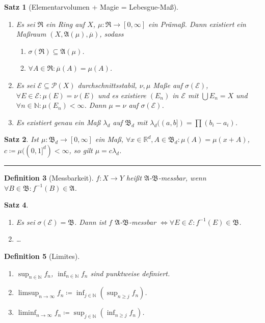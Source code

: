 \documentclass[a4paper]{article}
\newcounter{Sec}
\theoremstyle{marginbreak}
\newtheorem{definition}{Definition}[Sec]
\newtheorem{satz}[definition]{Satz}
\newcommand{\sep}{%
	\rule{\textwidth}{0.3pt}%
	\stepcounter{Sec}%
	}
\renewcommand{\P}{\mathcal{P}}
\newcommand{\R}{\mathbb{R}}
\newcommand{\A}{\mathfrak{A}}
\newcommand{\B}{\mathfrak{B}}
\newcommand{\Ri}{\mathfrak{R}}
\begin{document}
	\begin{satz}[Elementarvolumen + Magie = Lebesgue-Maß]
		\begin{enumerate}[label=(\alph*)]
			\item Es sei $\Ri$ ein Ring auf $X$, $\mu\colon\Ri\to[0, \infty]$ ein Prämaß. Dann
				existiert ein Maßraum $(X, \A(\mu), \overline{\mu})$, sodass
				\begin{enumerate}[label=(\arabic*)]
					\item $\sigma(\Ri)\subseteq\A(\mu)$.
					\item $\forall A\in\Ri:\overline{\mu}(A) = \mu(A)$.
				\end{enumerate}
			\item Es sei $\mathcal{E}\subseteq\P(X)$ durchschnittsstabil,
				$\nu, \mu$ Maße auf $\sigma(\mathcal{E})$,
				$\forall E\in\mathcal{E}: \mu(E)=\nu(E)$ und es existiere $(E_n)$ in $\mathcal{E}$
				mit $\bigcup E_n=X$ und $\forall n\in\mathbb{N}:\mu(E_n)<\infty$. Dann $\mu=\nu$ auf $\sigma(\mathcal{E})$.
			\item Es existiert genau ein Maß $\lambda_d$ auf $\B_d$ mit $\lambda_d((a, b]) = \prod (b_i - a_i)$.
		\end{enumerate}
	\end{satz}
	\begin{satz}
		Ist $\mu\colon\B_d\to[0,\infty]$ ein Maß, $\forall x\in\R^d, A\in\B_d: \mu(A)=\mu(x+A)$, $c\coloneqq\mu((0, 1]^d)<\infty$,
		so gilt $\mu=c\lambda_d$.
	\end{satz}
	\sep
	\begin{definition}[Messbarkeit]
		$f\colon X\to Y$ heißt $\A$-$\B$-messbar, wenn $\forall B\in\B:f^{-1}(B)\in\A$.
	\end{definition}
	\begin{satz}
		\begin{enumerate}[label=(\alph*)]
			\item Es sei $\sigma(\mathcal{E})=\B$. Dann ist $f$ $\A$-$\B$-messbar $\iff\forall E\in\mathcal{E}:f^{-1}(E)\in\B$.
			\item \ldots
		\end{enumerate}
	\end{satz}
	\begin{definition}[Limites]
		\begin{enumerate}[label=(\alph*)]
			\item $\sup_{n\in\mathbb{N}} f_n$, $\inf_{n\in\mathbb{N}} f_n$ sind punktweise definiert.
			\item $\limsup_{n\to\infty} f_n\coloneqq \inf_{j\in\mathbb{N}}\left(\sup_{n\geq j}f_n\right)$.
			\item $\liminf_{n\to\infty} f_n\coloneqq \sup_{j\in\mathbb{N}}\left(\inf_{n\geq j}f_n\right)$.
		\end{enumerate}
	\end{definition}
\end{document}
